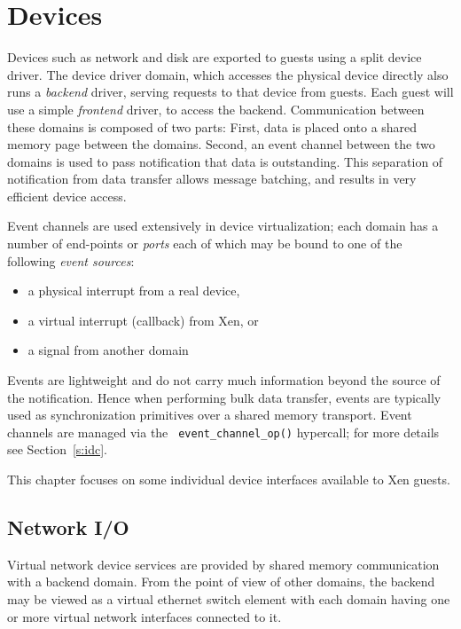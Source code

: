 \chapter{Devices}
\label{c:devices}

Devices such as network and disk are exported to guests using a split
device driver.  The device driver domain, which accesses the physical
device directly also runs a \emph{backend} driver, serving requests to
that device from guests.  Each guest will use a simple \emph{frontend}
driver, to access the backend.  Communication between these domains is
composed of two parts: First, data is placed onto a shared memory page
between the domains.  Second, an event channel between the two domains
is used to pass notification that data is outstanding.  This
separation of notification from data transfer allows message batching,
and results in very efficient device access.

Event channels are used extensively in device virtualization; each
domain has a number of end-points or \emph{ports} each of which may be
bound to one of the following \emph{event sources}:
\begin{itemize}
  \item a physical interrupt from a real device, 
  \item a virtual interrupt (callback) from Xen, or 
  \item a signal from another domain 
\end{itemize}

Events are lightweight and do not carry much information beyond the
source of the notification. Hence when performing bulk data transfer,
events are typically used as synchronization primitives over a shared
memory transport. Event channels are managed via the {\tt
  event\_channel\_op()} hypercall; for more details see
Section~\ref{s:idc}.

This chapter focuses on some individual device interfaces available to
Xen guests.


\section{Network I/O}

Virtual network device services are provided by shared memory
communication with a backend domain.  From the point of view of other
domains, the backend may be viewed as a virtual ethernet switch
element with each domain having one or more virtual network interfaces
connected to it.

